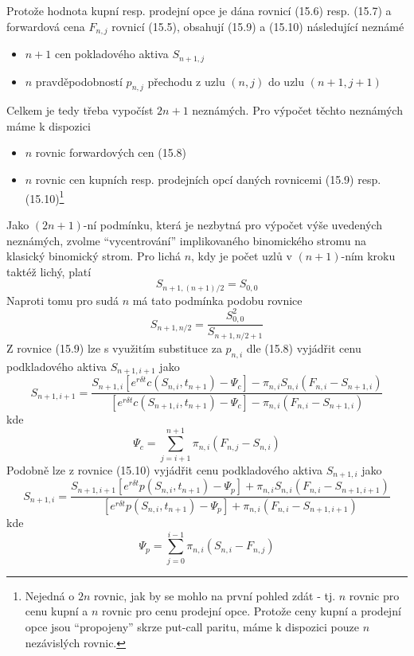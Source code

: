 \documentclass[a4paper]{book}
\begin{document}
Protože hodnota kupní resp. prodejní opce je dána rovnicí (15.6) resp. (15.7) a forwardová cena $F_{n,j}$ rovnicí (15.5), obsahují (15.9) a (15.10) následující neznámé
\begin{itemize}
\item $n+1$ cen pokladového aktiva $S_{n+1,j}$
\item $n$ pravděpodobností $p_{n,j}$ přechodu z uzlu $(n,j)$ do uzlu $(n+1,j+1)$
\end{itemize}
Celkem je tedy třeba vypočíst $2n+1$ neznámých. Pro výpočet těchto neznámých máme k dispozici
\begin{itemize}
\item $n$ rovnic forwardových cen (15.8)
\item $n$ rovnic cen kupních resp. prodejních opcí daných rovnicemi (15.9) resp. (15.10)\footnote{Nejedná o $2n$ rovnic, jak by se mohlo na první pohled zdát - tj. $n$ rovnic pro cenu kupní a $n$ rovnic pro cenu prodejní opce. Protože ceny kupní a prodejní opce jsou ``propojeny'' skrze put-call paritu, máme k dispozici pouze $n$ nezávislých rovnic.}
\end{itemize}
Jako $(2n+1)$-ní podmínku, která je nezbytná pro výpočet výše uvedených neznámých, zvolme ``vycentrování'' implikovaného binomického stromu na klasický binomický strom. Pro lichá $n$, kdy je počet uzlů v $(n+1)$-ním kroku taktéž lichý, platí
\begin{equation}
S_{n+1,(n+1)/2} = S_{0,0}
\end{equation}
Naproti tomu pro sudá $n$ má tato podmínka podobu rovnice
\begin{equation}
S_{n+1,n/2} = \frac{S_{0,0}^2}{S_{n+1, n/2 + 1}}
\end{equation}
Z rovnice (15.9) lze s využitím substituce za $p_{n,i}$ dle (15.8) vyjádřit cenu podkladového aktiva $S_{n+1,i+1}$ jako
\begin{equation}
S_{n+1,i+1}=\frac{S_{n+1,i}[e^{r\delta t}c(S_{n,i}, t_{n+1})-\Psi_c]-\pi_{n,i}S_{n,i}(F_{n,i} - S_{n+1,i})}{[e^{r \delta t}c(S_{n+1,i},t_{n+1})-\Psi_c]-\pi_{n,i}(F_{n,i}-S_{n+1,i})}
\end{equation}
kde
\begin{equation*}
\Psi_c = \sum_{j = i + 1}^{n+1}\pi_{n,i}(F_{n,j}-S_{n,i})
\end{equation*}
Podobně lze z rovnice (15.10) vyjádřit cenu podkladového aktiva $S_{n+1,i}$ jako
\begin{equation}
S_{n+1,i} = \frac{S_{n+1,i+1}[e^{r \delta t}p(S_{n,i},t_{n+1})-\Psi_p]+\pi_{n,i}S_{n,i}(F_{n,i}-S_{n+1,i+1})}{[e^{r \delta t}p(S_{n,i},t_{n+1})-\Psi_p]+\pi_{n,i}(F_{n,i}-S_{n+1,i+1})}
\end{equation}
kde
\begin{equation*}
\Psi_p = \sum_{j = 0}^{i-1}\pi_{n,i}(S_{n,i}-F_{n,j})
\end{equation*}
\end{document}
